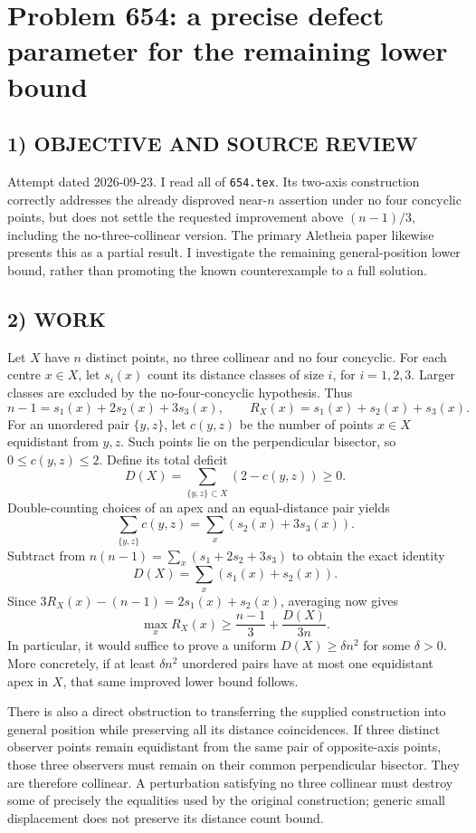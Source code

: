 \section{Problem 654: a precise defect parameter for the remaining lower bound}
\subsection*{1) OBJECTIVE AND SOURCE REVIEW}
Attempt dated 2026-09-23. I read all of \texttt{654.tex}. Its two-axis construction correctly addresses the already disproved near-$n$ assertion under no four concyclic points, but does not settle the requested improvement above $(n-1)/3$, including the no-three-collinear version. The primary Aletheia paper likewise presents this as a partial result. I investigate the remaining general-position lower bound, rather than promoting the known counterexample to a full solution.
\subsection*{2) WORK}
Let $X$ have $n$ distinct points, no three collinear and no four concyclic. For each centre $x\in X$, let $s_i(x)$ count its distance classes of size $i$, for $i=1,2,3$. Larger classes are excluded by the no-four-concyclic hypothesis. Thus
\[
n-1=s_1(x)+2s_2(x)+3s_3(x),\qquad
R_X(x)=s_1(x)+s_2(x)+s_3(x).
\]
For an unordered pair $\{y,z\}$, let $c(y,z)$ be the number of points $x\in X$ equidistant from $y,z$. Such points lie on the perpendicular bisector, so $0\le c(y,z)\le2$. Define its total deficit
\[
D(X)=\sum_{\{y,z\}\subset X}(2-c(y,z))\ge0.
\]
Double-counting choices of an apex and an equal-distance pair yields
\[
\sum_{\{y,z\}}c(y,z)=\sum_x(s_2(x)+3s_3(x)).
\]
Subtract from $n(n-1)=\sum_x(s_1+2s_2+3s_3)$ to obtain the exact identity
\[
D(X)=\sum_x(s_1(x)+s_2(x)).
\]
Since $3R_X(x)-(n-1)=2s_1(x)+s_2(x)$, averaging now gives
\[
\max_xR_X(x)\ge\frac{n-1}{3}+\frac{D(X)}{3n}.
\]
In particular, it would suffice to prove a uniform $D(X)\ge\delta n^2$ for some $\delta>0$. More concretely, if at least $\delta n^2$ unordered pairs have at most one equidistant apex in $X$, that same improved lower bound follows.

There is also a direct obstruction to transferring the supplied construction into general position while preserving all its distance coincidences. If three distinct observer points remain equidistant from the same pair of opposite-axis points, those three observers must remain on their common perpendicular bisector. They are therefore collinear. A perturbation satisfying no three collinear must destroy some of precisely the equalities used by the original construction; generic small displacement does not preserve its distance count bound.

